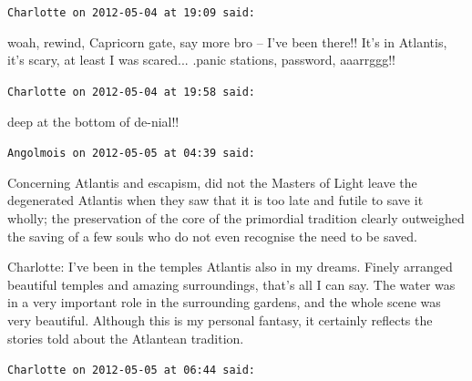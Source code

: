\begin{footnotesize}
\begin{sffamily}
\hfill

\texttt{Charlotte on 2012-05-04 at 19:09 said:}

woah, rewind, Capricorn gate, say more bro -- I've been there!! It's in Atlantis, it's scary, at least I was scared... .panic stations, password, aaarrggg!!

\hfill

\texttt{Charlotte on 2012-05-04 at 19:58 said:}

deep at the bottom of de-nial!!

\hfill

\texttt{Angolmois on 2012-05-05 at 04:39 said:}

Concerning Atlantis and escapism, did not the Masters of Light leave the degenerated Atlantis when they saw that it is too late and futile to save it wholly; the preservation of the core of the primordial tradition clearly outweighed the saving of a few souls who do not even recognise the need to be saved.

Charlotte: I've been in the temples Atlantis also in my dreams. Finely arranged beautiful temples and amazing surroundings, that's all I can say. The water was in a very important role in the surrounding gardens, and the whole scene was very beautiful. Although this is my personal fantasy, it certainly reflects the stories told about the Atlantean tradition.

\hfill

\texttt{Charlotte on 2012-05-05 at 06:44 said:}


\end{sffamily}
\end{footnotesize}
